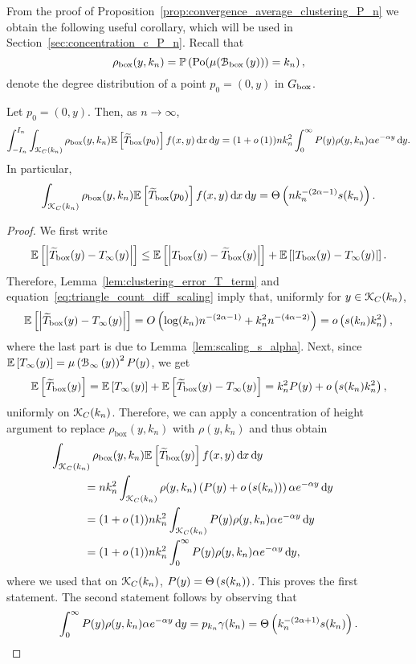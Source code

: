 From the proof of Proposition~\ref{prop:convergence_average_clustering_P_n} we obtain the following useful corollary, which will be used in Section~\ref{sec:concentration_c_P_n}. Recall that
\[
	\rho_{\mathrm{box}}(y,k_n) = \mathbb{P}\left({\mathrm{Po}}(\mu({\mathcal B}_{\text{box}}\left(y\right))) = k_n\right),
\]
denote the degree distribution of a point $p_0 = (0,y)$ in $G_{\mathrm{box}}$.

\begin{corollary}\label{cor:adjusted_triangle_counting_P_n}
Let $p_0 = (0,y)$. Then, as $n \to \infty$,
\[
	\int_{-I_n}^{I_n}\int_{{\mathcal K}_{C}(k_n)} \rho_{\text{box}}(y,k_n) \mathbb{E}\left[\widetilde{T}_{\text{box}}(p_0)\right] f(x,y) \operatorname{\mathrm{d}\hspace{-2pt}} x \operatorname{\mathrm{d}\hspace{-2pt}} y
	= (1+o\left(1\right)) n k_n^2 \int_0^\infty P(y) \rho(y,k_n) \alpha e^{-\alpha y} \operatorname{\mathrm{d}\hspace{-2pt}} y. 
\]
In particular,
\[
	\int_{{\mathcal K}_{C}(k_n)} \rho_{\text{box}}(y,k_n) \mathbb{E}\left[\widetilde{T}_{\text{box}}(p_0)\right] f(x,y) \operatorname{\mathrm{d}\hspace{-2pt}} x \operatorname{\mathrm{d}\hspace{-2pt}} y
	= \Theta\left(n k_n^{-(2\alpha - 1)} s(k_n)\right).
\]
\end{corollary}

\begin{proof}
We first write
\[
	\mathbb{E}\left[\left|\widetilde{T}_{\text{box}}(y) - T_{\infty}(y)\right|\right] 
	\le \mathbb{E}\left[\left|T_{\text{box}}(y) - \widetilde{T}_{\text{box}}(y) \right|\right]
	+\mathbb{E}\left[\left|T_{\text{box}}(y) - T_{\infty}(y)\right|\right].
\]
Therefore, Lemma~\ref{lem:clustering_error_T_term} and equation~\eqref{eq:triangle_count_diff_scaling} imply that, uniformly for $y \in {\mathcal K}_C(k_n)$,
\[
	\mathbb{E}\left[\left|\widetilde{T}_{\text{box}}(y) - T_{\infty}(y)\right|\right] = O\left(\log(k_n)n^{-(2\alpha - 1)}
	+ k_n^2 n^{-(4\alpha - 2)}\right)	= o\left(s(k_n) k_n^2\right),
\]
where the last part is due to Lemma~\ref{lem:scaling_s_alpha}.
Next, since $\mathbb{E}\left[T_\infty(y)\right] = \mu\left({\mathcal B}_{\infty}\left(y\right)\right)^2 P(y)$, we get
\[
	\mathbb{E}\left[\widetilde{T}_{\text{box}}(y)\right] = \mathbb{E}\left[T_{\infty}(y)\right] + \mathbb{E}\left[\widetilde{T}_{\text{box}}(y) - T_{\infty}(y)\right] 
	= k_n^2 P(y) + o\left(s(k_n)k_n^2\right),
\]
uniformly on ${\mathcal K}_{C}(k_n)$. Therefore, we can apply a concentration of height argument to replace $\rho_{\text{box}}(y,k_n)$ with $\rho(y,k_n)$ and thus obtain
\begin{align*}
	&\hspace{-30pt}\int_{\Kcal_{C}(k_n)} \rho_{\text{box}}(y,k_n) \Exp{\widetilde{T}_{\text{box}}(y)} 
		f(x,y) \dd x \dd y\\
	&= n k_n^2 \int_{\Kcal_{C}(k_n)} \rho(y,k_n) \left(P(y) + \smallO{s(k_n)}\right)
		\alpha e^{-\alpha y} \dd y\\
	&= (1+\smallO{1}) n k_n^2 \int_{\Kcal_{C}(k_n)} P(y) \rho(y,k_n) \alpha e^{-\alpha y} \dd y\\
	&= (1+\smallO{1}) n k_n^2 \int_0^\infty P(y) \rho(y,k_n) \alpha e^{-\alpha y} \dd y,
\end{align*}
where we used that on ${\mathcal K}_{C}(k_n)$, $P(y) = \Theta\left(s(k_n)\right)$. This proves the first statement. The second statement follows by observing that
\[
	\int_0^\infty P(y) \rho(y,k_n) \alpha e^{-\alpha y} \operatorname{\mathrm{d}\hspace{-2pt}} y = p_{k_n} \gamma(k_n)
	= \Theta\left(k_n^{-(2\alpha + 1)} s(k_n)\right).
\]
\end{proof}

